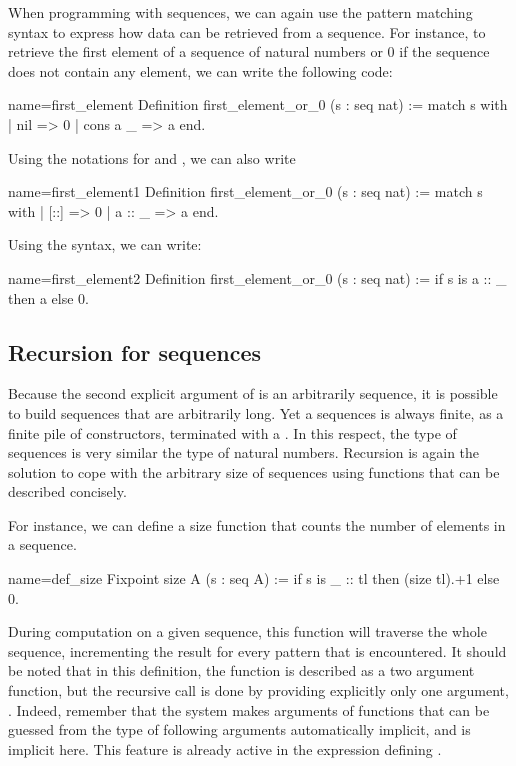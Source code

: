 When programming with sequences, we can again use the  pattern matching
syntax to express how data can be retrieved from a sequence.  For
instance, to retrieve the first element of a sequence of natural numbers
or 0 if the sequence does not contain any element, we can write the
following code:

\begin{coq}{name=first_element}{}
Definition first_element_or_0 (s : seq nat) :=
  match s with
  | nil => 0
  | cons a _ => a
  end.
\end{coq}
Using the notations for  and , we can also write

\begin{coq}{name=first_element1}{}
Definition first_element_or_0 (s : seq nat) :=
  match s with
  | [::] => 0
  | a :: _ => a
  end.
\end{coq}
Using the  syntax, we can write:

\begin{coq}{name=first_element2}{}
Definition first_element_or_0 (s : seq nat) :=
  if s is a :: _ then a else 0.
\end{coq}



\subsection{Recursion for sequences}
Because the second explicit argument of  is an arbitrarily
sequence, it is possible to build sequences that are arbitrarily long.
Yet a sequences is always finite, as a finite pile of 
constructors, terminated with a .
In this respect, the type  of sequences is very similar the
type  of natural numbers.  Recursion is again the solution to
cope with the arbitrary
size of sequences using functions that can be described concisely.

For instance, we can define a size function that counts the number of
elements in a sequence.

\begin{coq}{name=def_size}{}
Fixpoint size A (s : seq A) :=
  if s is _ :: tl then (size tl).+1 else 0.
\end{coq}
During computation on a given sequence, this function will traverse
the whole sequence, incrementing the result for every
 pattern that is encountered.  It should be noted that in this
definition, the function  is described as a two argument
function, but the recursive call  is done by providing
explicitly only one argument, . Indeed, remember that
the \Coq{} system makes
arguments of functions that can be guessed from the type of following
arguments automatically implicit, and  is implicit here. This
feature is already active in the expression defining .

